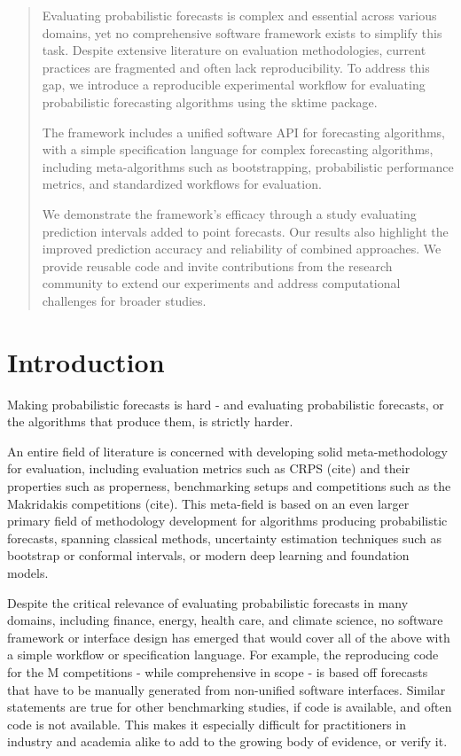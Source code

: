
\begin{abstract}
Evaluating probabilistic forecasts is complex and essential across various domains, yet no comprehensive software framework exists to simplify this task. Despite extensive literature on evaluation methodologies, current practices are fragmented and often lack reproducibility. To address this gap, we introduce a reproducible experimental workflow for evaluating probabilistic forecasting algorithms using the sktime package.

The framework includes a unified software API for forecasting algorithms, with a simple specification language for complex forecasting algorithms, including meta-algorithms such as bootstrapping, probabilistic performance metrics, and standardized workflows for evaluation.

We demonstrate the framework's efficacy through a study evaluating prediction intervals added to point forecasts. Our results also highlight the improved prediction accuracy and reliability of combined approaches. We provide reusable code and invite contributions from the research community to extend our experiments and address computational challenges for broader studies.
\end{abstract}

\section{Introduction}

Making probabilistic forecasts is hard - and evaluating probabilistic forecasts, or the algorithms that produce them, is strictly harder.

An entire field of literature is concerned with developing solid meta-methodology for evaluation, including evaluation metrics such as CRPS (cite) and their properties such as properness, benchmarking setups and competitions such as the Makridakis competitions (cite). This meta-field is based on an even larger primary field of methodology development for algorithms producing probabilistic forecasts, spanning classical methods, uncertainty estimation techniques such as bootstrap or conformal intervals, or modern deep learning and foundation models.

Despite the critical relevance of evaluating probabilistic forecasts in many domains, including finance, energy, health care, and climate science, no software framework or interface design has emerged that would cover all of the above with a simple workflow or specification language. For example, the reproducing code for the M competitions - while comprehensive in scope - is based off forecasts that have to be manually generated from non-unified software interfaces. Similar statements are true for other benchmarking studies, if code is available, and often code is not available. This makes it especially difficult for practitioners in industry and academia alike to add to the growing body of evidence, or verify it.

